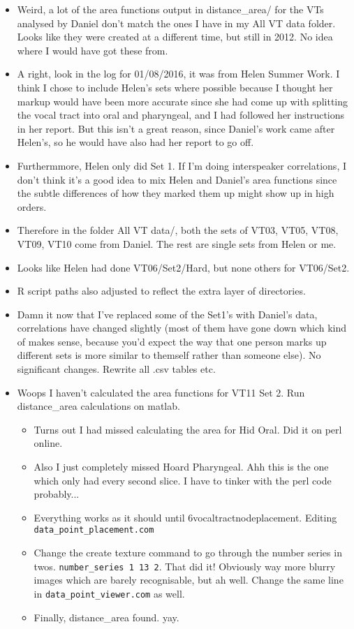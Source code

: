 \documentclass{article}
\begin{document}
\begin{itemize}
\begin{itemize}
        \item Weird, a lot of the area functions output in distance\_area/ for the VTs analysed by Daniel don't match the ones I have in my All VT data folder. Looks like they were created at a different time, but still in 2012. No idea where I would have got these from.
        \item A right, look in the log for 01/08/2016, it was from Helen Summer Work. I think I chose to include Helen's sets where possible because I thought her markup would have been more accurate since she had come up with splitting the vocal tract into oral and pharyngeal, and I had followed her instructions in her report. But this isn't a great reason, since Daniel's work came after Helen's, so he would have also had her report to go off. 
        \item Furthermmore, Helen only did Set 1. If I'm doing interspeaker correlations, I don't think it's a good idea to mix Helen and Daniel's area functions since the subtle differences of how they marked them up might show up in high orders.
        \item Therefore in the folder All VT data/, both the sets of VT03, VT05, VT08, VT09, VT10 come from Daniel. The rest are single sets from Helen or me.
        \item Looks like Helen had done VT06/Set2/Hard, but none others for VT06/Set2.
        \item R script paths also adjusted to reflect the extra layer of directories. 
        \item Damn it now that I've replaced some of the Set1's with Daniel's data, correlations have changed slightly (most of them have gone down which kind of makes sense, because you'd expect the way that one person marks up different sets is more similar to themself rather than someone else). No significant changes. Rewrite all .csv tables etc.
        \item Woops I haven't calculated the area functions for VT11 Set 2. Run distance\_area calculations on matlab.
        \begin{itemize}
            \item Turns out I had missed calculating the area for Hid Oral. Did it on perl online.
            \item Also I just completely missed Hoard Pharyngeal. Ahh this is the one which only had every second slice. I have to tinker with the perl code probably...
            \item Everything works as it should until 6vocaltractnodeplacement. Editing \verb|data_point_placement.com|
            \item Change the create texture command to go through the number series in twos. \verb|number_series 1 13 2|. That did it! Obviously way more blurry images which are barely recognisable, but ah well. Change the same line in \verb|data_point_viewer.com| as well.
            \item Finally, distance\_area found. yay.
        \end{itemize}
    \end{itemize}
\end{itemize}
\end{document}
